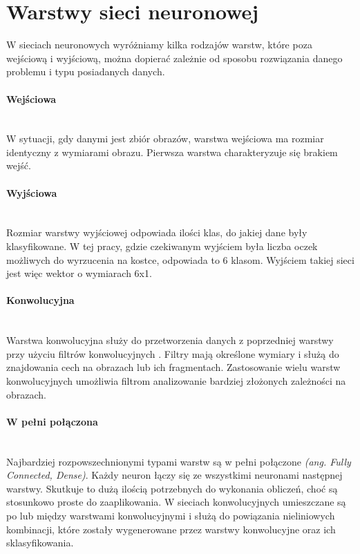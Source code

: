 \section{Warstwy sieci neuronowej}

W sieciach neuronowych wyróżniamy kilka rodzajów warstw, które poza wejściową i wyjściową,
można dopierać zależnie od sposobu rozwiązania danego problemu i typu posiadanych danych.

\paragraph{Wejściowa} \mbox{}\\
W sytuacji, gdy danymi jest zbiór obrazów, warstwa wejściowa ma rozmiar identyczny z
wymiarami obrazu. Pierwsza warstwa charakteryzuje się brakiem wejść.

\paragraph{Wyjściowa} \mbox{}\\
Rozmiar warstwy wyjściowej odpowiada ilości klas, do jakiej dane były klasyfikowane.
W tej pracy, gdzie czekiwanym wyjściem była liczba oczek możliwych do wyrzucenia na
kostce, odpowiada to 6 klasom. Wyjściem takiej sieci jest więc wektor o wymiarach 6x1.

\paragraph{Konwolucyjna} \mbox{}\\
Warstwa konwolucyjna służy do przetworzenia danych z poprzedniej warstwy przy użyciu
filtrów konwolucyjnych \cite{CS231n}. Filtry mają określone wymiary i służą do znajdowania cech
na obrazach lub ich fragmentach. Zastosowanie wielu warstw konwolucyjnych umożliwia filtrom
analizowanie bardziej złożonych zależności na obrazach.

\paragraph{W pełni połączona} \mbox{}\\
Najbardziej rozpowszechnionymi typami warstw są w pełni połączone \textit{(ang. Fully Connected, Dense)}.
Każdy neuron łączy się ze wszystkimi neuronami następnej warstwy. Skutkuje to dużą ilością
potrzebnych do wykonania obliczeń, choć są stosunkowo proste do zaaplikowania.
W sieciach konwolucyjnych umieszczane są po lub między warstwami konwolucyjnymi
i służą do powiązania nieliniowych kombinacji, które zostały wygenerowane przez
warstwy konwolucyjne oraz ich sklasyfikowania.

